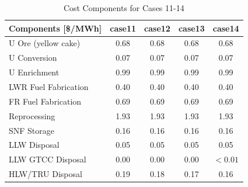 \begin{table}[htbp]
\begin{center}
\caption{Cost Components for Cases 11-14}
\label{ses_table13_1}
\begin{tabular}{|l|c|c|c|c|}
\hline
\textbf{Components [\$/MWh]} & \textbf{case11} & \textbf{case12} & \textbf{case13} & \textbf{case14} \\
\hline
U Ore (yellow cake)          & 0.68            & 0.68            & 0.68            & 0.68 \\
U Conversion                 & 0.07            & 0.07            & 0.07            & 0.07 \\
U Enrichment                 & 0.99            & 0.99            & 0.99            & 0.99 \\
LWR Fuel Fabrication         & 0.40            & 0.40            & 0.40            & 0.40 \\
FR Fuel Fabrication          & 0.69            & 0.69            & 0.69            & 0.69 \\
Reprocessing                 & 1.93            & 1.93            & 1.93            & 1.93 \\
SNF Storage                  & 0.16            & 0.16            & 0.16            & 0.16 \\
LLW Disposal                 & 0.05            & 0.05            & 0.05            & 0.05 \\
LLW GTCC Disposal            & 0.00            & 0.00            & 0.00            & $<0.01$ \\
HLW/TRU Disposal             & 0.19            & 0.18            & 0.17            & 0.16 \\
\hline
\end{tabular}
\end{center}
\end{table}


